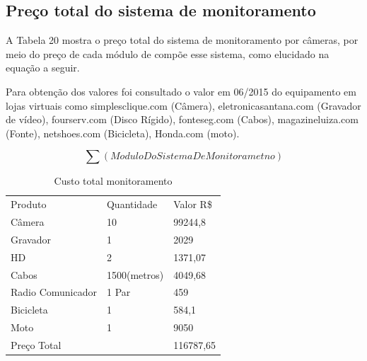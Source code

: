 \subsection{Preço total do sistema de monitoramento}

A Tabela 20 mostra o preço total do sistema de monitoramento por câmeras, por meio do preço de cada módulo de compõe esse sistema, como elucidado na equação a seguir.

Para obtenção dos valores foi consultado o valor em 06/2015 do equipamento em lojas virtuais como simplesclique.com (Câmera), eletronicasantana.com (Gravador de vídeo), fourserv.com (Disco Rígido), fonteseg.com (Cabos), magazineluiza.com (Fonte), netshoes.com (Bicicleta), Honda.com (moto).

\begin{equation}
	\sum (Modulo Do Sistema De Monitorametno)
\end{equation}
 
\begin{table}[h]
\centering
\caption{Custo total monitoramento}
\label{Custo total monitoramento}
\begin{tabular}{llll}
 &  &  &  \\ \hline
\multicolumn{1}{|l|}{Produto} & \multicolumn{1}{l|}{Quantidade} & \multicolumn{2}{l|}{Valor R\$} \\ \hline
\multicolumn{1}{|l|}{Câmera} & \multicolumn{1}{l|}{10} & \multicolumn{2}{l|}{99244,8} \\ \hline
\multicolumn{1}{|l|}{Gravador} & \multicolumn{1}{l|}{1} & \multicolumn{2}{l|}{2029} \\ \hline
\multicolumn{1}{|l|}{HD} & \multicolumn{1}{l|}{2} & \multicolumn{2}{l|}{1371,07} \\ \hline
\multicolumn{1}{|l|}{Cabos} & \multicolumn{1}{l|}{1500(metros)} & \multicolumn{2}{l|}{4049,68} \\ \hline
\multicolumn{1}{|l|}{Radio Comunicador} & \multicolumn{1}{l|}{1 Par} & \multicolumn{2}{l|}{459} \\ \hline
\multicolumn{1}{|l|}{Bicicleta} & \multicolumn{1}{l|}{1} & \multicolumn{2}{l|}{584,1} \\ \hline
\multicolumn{1}{|l|}{Moto} & \multicolumn{1}{l|}{1} & \multicolumn{2}{l|}{9050} \\ \hline
\multicolumn{2}{|l|}{Preço Total} & \multicolumn{2}{l|}{116787,65} \\ \hline
\end{tabular}
\end{table}